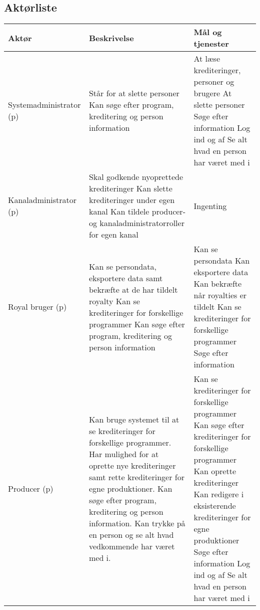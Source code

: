 \subsection{Aktørliste}



\begin{longtable}{ |p{3.7cm}|p{6.15cm}|p{6.15cm}| }
\hline
\textbf{Aktør} & \textbf{Beskrivelse} & \textbf{Mål og tjenester} \\
\hline
Systemadministrator (p) 
& Står for at slette personer \newline Kan søge efter program, kreditering og person information 
& At læse krediteringer, personer og brugere \newline At slette personer \newline Søge efter information \newline Log ind og af \newline Se alt hvad en person har været med i\\

\hline
Kanaladministrator (p) 
& Skal godkende nyoprettede krediteringer \newline Kan slette krediteringer under egen kanal \newline Kan tildele producer- og kanaladministratorroller for egen kanal  
& Ingenting\\

\hline
Royal bruger (p) 
& Kan se persondata, eksportere data samt bekræfte at de har tildelt royalty \newline Kan se krediteringer for forskellige programmer \newline Kan søge efter program, kreditering og person information
& Kan se persondata \newline Kan eksportere data \newline Kan bekræfte når royalties er tildelt \newline Kan se krediteringer for forskellige programmer \newline Søge efter information \\

\hline
Producer (p) 
& Kan bruge systemet til at se krediteringer for forskellige programmer. \newline Har mulighed for at oprette nye krediteringer samt rette krediteringer for egne produktioner. \newline Kan søge efter program, kreditering og person information. \newline Kan trykke på en person og se alt hvad vedkommende har været med i.
& Kan se krediteringer for forskellige programmer \newline Kan søge efter krediteringer for forskellige programmer \newline Kan oprette krediteringer \newline Kan redigere i eksisterende krediteringer for egne produktioner \newline Søge efter information \newline Log ind og af \newline Se alt hvad en person har været med i \\


\end{longtable}
